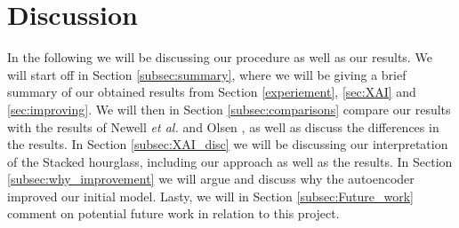 \documentclass[./main.tex]{subfiles}
\begin{document}
\section{Discussion}\label{sec:discussion}
In the following we will be discussing our procedure as well as our results. We will start off in Section \ref{subsec:summary}, where we will be giving a brief summary of our obtained results from Section \ref{experiement}, \ref{sec:XAI} and \ref{sec:improving}. We will then in Section \ref{subsec:comparisons} compare our results with the results of Newell \textit{et al.} \cite{Newell} and Olsen \cite{Camilla}, as well as discuss the differences in the results. In Section \ref{subsec:XAI_disc} we will be discussing our interpretation of the Stacked hourglass, including our approach as well as the results. In Section \ref{subsec:why_improvement} we will argue and discuss why the autoencoder improved our initial model. Lasty, we will in Section \ref{subsec:Future_work} comment on potential future work in relation to this project.
\end{document}
